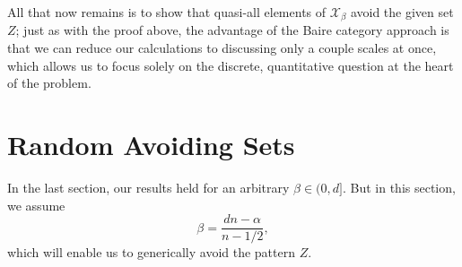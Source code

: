 \documentclass[12pt,reqno]{article}
\numberwithin{equation}{section}
\begin{document}
All that now remains is to show that quasi-all elements of $\mathcal{X}_\beta$ avoid the given set $Z$; just as with the proof above, the advantage of the Baire category approach is that we can reduce our calculations to discussing only a couple scales at once, which allows us to focus solely on the discrete, quantitative question at the heart of the problem.

\section{Random Avoiding Sets} 

In the last section, our results held for an arbitrary $\beta \in (0,d]$. But in this section, we assume
%
\[ \beta = \frac{dn - \alpha}{n - 1/2}, \]
%
which will enable us to generically avoid the pattern $Z$.
\end{document}
